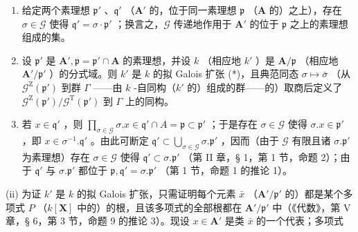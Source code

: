 \begin{enumerate}
\def\labelenumi{(\roman{enumi})}
\item
  给定两个素理想 \(\mathfrak{p}'\) 、\(\mathfrak{q}'\) （\(\mathbf{A}'\) 的，位于同一素理想 \(\mathfrak{p}\) （\(\mathbf{A}\) 的）之上），存在 \(\sigma \in \mathcal{G}\) 使得 \(\mathfrak{q}' = \sigma \cdot \mathfrak{p}'\) ；换言之，\(\mathcal{G}\) 传递地作用于 \(\mathbf{A}'\) 的位于 \(\mathfrak{p}\) 之上的素理想组成的集。
\item
  设 \(\mathfrak{p}'\) 是 \(\mathbf{A}', \mathfrak{p} = \mathfrak{p}' \cap \mathbf{A}\) 的素理想，并设 \(k\) （相应地 \(k'\) ）是 \(\mathbf{A}/\mathfrak{p}\) （相应地 \(\mathbf{A}'/\mathfrak{p}'\) ）的分式域。则 \(k'\) 是 \(k\) 的拟 Galois 扩张 (*)，且典范同态 \(\sigma \mapsto \bar{\sigma}\) （从 \(\mathcal{G}^{\mathrm{Z}}(\mathfrak{p}')\) 到群 \(\Gamma\) ——由 \(k\) -自同构（\(k'\) 的）组成的群——的）取商后定义了 \(\mathcal{G}^{\mathrm{Z}}(\mathfrak{p}') / \mathcal{G}^{\mathrm{T}}(\mathfrak{p}')\) 到 \(\Gamma\) 上的同构。
\setcounter{enumi}{0}
\item
  若 \(x \in \mathfrak{q}'\) ，则 \(\prod_{\sigma \in \mathcal{G}} \sigma. x \in \mathfrak{q}' \cap A = \mathfrak{p} \subset \mathfrak{p}'\) ；于是存在 \(\sigma \in \mathcal{G}\) 使得 \(\sigma. x \in \mathfrak{p}'\) ，即 \(x \in \sigma^{-1}. \mathfrak{q}'\) 。由此可断定 \(\mathfrak{q}' \subset \bigcup_{\sigma \in \mathcal{G}} \sigma. \mathfrak{p}'\) ，因而（由于 \(\mathcal{G}\) 有限且诸 \(\sigma. \mathfrak{p}'\) 为素理想）存在 \(\sigma \in \mathcal{G}\) 使得 \(\mathfrak{q}' \subset \sigma. \mathfrak{p}'\) （第 II 章，§ 1，第 1 节，命题 2）；由于 \(\mathfrak{q}'\) 与 \(\sigma. \mathfrak{p}'\) 都位于 \(\mathfrak{p}, \mathfrak{q}' = \sigma. \mathfrak{p}'\) （第 1 节，命题 1 的推论 1）。
\end{enumerate}

(ii) 为证 \(k'\) 是 \(k\) 的拟 Galois 扩张，只需证明每个元素 \(\bar{x}\) （\(\mathbf{A}'/\mathfrak{p}'\) 的）都是某个多项式 \(P\) （\(k[\mathbf{X}]\) 中的）的根，且该多项式的全部根都在 \(\mathbf{A}'/\mathfrak{p}'\) 中（《代数》，第 V 章，§ 6，第 3 节，命题 9 的推论 3）。现设 \(x \in \mathbf{A}'\) 是类 \(\bar{x}\) 的一个代表；多项式


